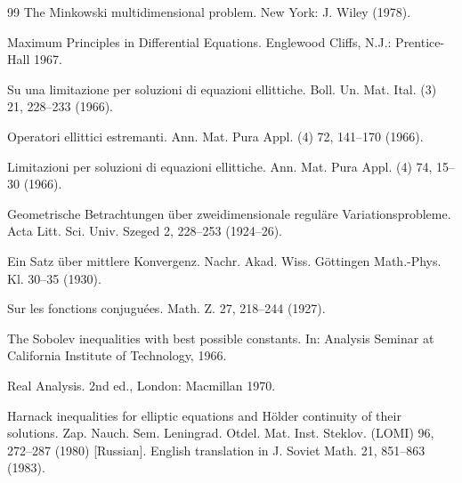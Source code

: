 \begin{thebibliography}{99}
The Minkowski multidimensional problem. New York: J. Wiley (1978).

Maximum Principles in Differential Equations. Englewood Cliffs, N.J.: Prentice-Hall 1967.

Su una limitazione per soluzioni di equazioni ellittiche. Boll. Un. Mat. Ital. (3) 21, 228--233 (1966).

Operatori ellittici estremanti. Ann. Mat. Pura Appl. (4) 72, 141--170 (1966).

Limitazioni per soluzioni di equazioni ellittiche. Ann. Mat. Pura Appl. (4) 74, 15--30 (1966).

Geometrische Betrachtungen über zweidimensionale reguläre Variationsprobleme. Acta Litt. Sci. Univ. Szeged 2, 228--253 (1924--26).

Ein Satz über mittlere Konvergenz. Nachr. Akad. Wiss. Göttingen Math.-Phys. Kl. 30--35 (1930).

Sur les fonctions conjuguées. Math. Z. 27, 218--244 (1927).

The Sobolev inequalities with best possible constants. In: Analysis Seminar at California Institute of Technology, 1966.

Real Analysis. 2nd ed., London: Macmillan 1970.

Harnack inequalities for elliptic equations and Hölder continuity of their solutions. Zap. Nauch. Sem. Leningrad. Otdel. Mat. Inst. Steklov. (LOMI) 96, 272--287 (1980) [Russian]. English translation in J. Soviet Math. 21, 851--863 (1983).

\end{thebibliography}


